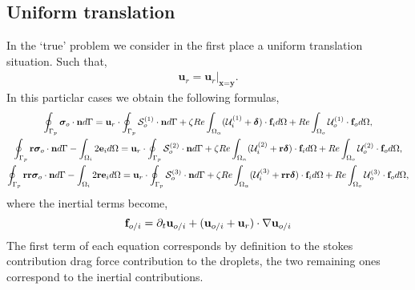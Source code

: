 \subsection{Uniform translation}
In the `true' problem we consider in the first place a uniform translation situation.
Such that, 
\begin{align*}
    \textbf{u}_r = \textbf{u}_r|_{\textbf{x}=\textbf{y}} . 
\end{align*}
In this particlar cases we obtain the following formulas,
\begin{multline}
    \intS[p]{\bm\sigma_{o}\cdot \textbf{n}}
    =
    \textbf{u}_{r}\cdot\intS[p]{ \mathcal{S}_o^{(1)} \cdot \textbf{n}}
    + \zeta Re \intO{(\mathcal{U}_{i}^{(1)} + \bm\delta)\cdot \textbf{f}_{i}} 
    + Re\intO[o]{\mathcal{U}_{o}^{(1)}\cdot \textbf{f}_{o}},\\
    \intS[p]{\textbf{r}  \bm\sigma_{o}\cdot \textbf{n}}
    - \intO[i]{2\textbf{e}_i}
    =
    \textbf{u}_{r}\cdot\intS[p]{  \mathcal{S}_o^{(2)}\cdot \textbf{n}}
    + \zeta Re \intO{(\mathcal{U}_{i}^{(2)}  + \textbf{r}\bm\delta)\cdot \textbf{f}_{i}} 
    + Re\intO[o]{\mathcal{U}_{o}^{(2)}\cdot \textbf{f}_{o}},\\
    \intS[p]{\textbf{rr}  \bm\sigma_{o}\cdot \textbf{n}}
    - \intO[i]{2\textbf{re}_i}
    =
    \textbf{u}_{r}\cdot\intS[p]{ \mathcal{S}_o^{(3)}\cdot \textbf{n}}
    + \zeta Re \intO{(\mathcal{U}_{i}^{(3)} + \textbf{rr}\bm\delta)\cdot \textbf{f}_{i}} 
    + Re\intO[o]{\mathcal{U}_{o}^{(3)} \cdot \textbf{f}_{o}},
\end{multline}
where the inertial terms become, 
\begin{equation}
    \textbf{f}_{o/i} = \pddt \textbf{u}_{o/i} + (\textbf{u}_{o/i} + \textbf{u}_r) \cdot \grad \textbf{u}_{o/i}
\end{equation}
The first term of each equation corresponds by definition to the stokes contribution drag force contribution to the droplets, the two remaining ones correspond to the inertial contributions. 

